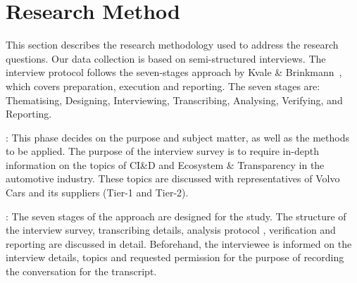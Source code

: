 \section{Research Method}\label{sec:researchMethod}

This section describes the research methodology used to address the research questions.
Our data collection is based on semi-structured interviews. 
The interview protocol follows the seven-stages approach by Kvale \& Brinkmann~\cite{Kvale2015Interviews}, which covers preparation, execution and reporting. The seven stages are: Thematising, Designing, Interviewing, Transcribing, Analysing, Verifying, and Reporting. %



: This phase decides on the purpose and subject matter, as well as the methods to be applied. The purpose of the interview survey is to require in-depth information on the topics of CI\&D %
and Ecosystem \& Transparency in the automotive industry. These topics are discussed with representatives of Volvo Cars and its suppliers (Tier-1 and Tier-2). %

: The seven stages of the approach are designed for the study. The structure of the interview survey, transcribing details, analysis protocol \cite{saldana2015coding}, verification and reporting are discussed in detail. Beforehand, the interviewee is informed on the interview details, topics and requested permission for the purpose of recording the conversation for the transcript. %

